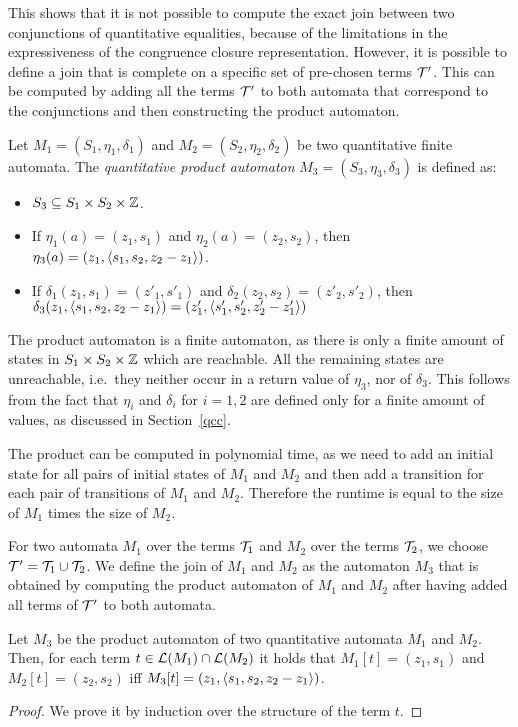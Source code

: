This shows that it is not possible to compute the exact join between two conjunctions of quantitative equalities, because of the limitations in the expressiveness of the congruence closure representation.
However, it is possible to define a join that is complete on  a specific set of pre-chosen terms $\mathcal{T}'$.
This can be computed by adding all the terms $\mathcal{T}'$ to both automata that correspond to the conjunctions and then constructing the product automaton.

\begin{definition}
    Let $M_1 = (S_1,\eta_1,\delta_1)$ and $M_2 = (S_2, \eta_2,\delta_2)$ be two quantitative finite automata. The \emph{quantitative product automaton} $M_3 = (S_3, \eta_3, \delta_3)$ is defined as:
    \begin{itemize}
        \item $S_3 \subseteq S_1 \times S_2 \times \mathbb{Z}$.
        \item If $\eta_1(a) = (z_1, s_1)$ and $\eta_2(a) = (z_2, s_2)$, then
              $\eta_3(a) = (z_1, \langle s_1, s_2, z_2-z_1\rangle)$.
        \item If $\delta_1(z_1, s_1) = (z'_1, s'_1)$ and $\delta_2(z_2, s_2) = (z'_2, s'_2)$, then $\delta_3(z_1, \langle s_1, s_2, z_2 - z_1\rangle) =  (z'_1, \langle s'_1, s'_2, z'_2 -z'_1\rangle)$
    \end{itemize}
\end{definition}

The product automaton is a finite automaton, as there is only a finite amount of states in $S_1 \times S_2 \times \mathbb{Z}$ which are reachable.
All the remaining states are unreachable, i.e.\ they neither occur in a return value of $\eta_3$, nor of $\delta_3$.
This follows from the fact that $\eta_i$ and $\delta_i$ for $i = 1,2$ are defined only for a finite amount of values, as discussed in Section~\ref{qcc}.

The product can be computed in polynomial time, as we need to add an initial state for all pairs of initial states of $M_1$ and $M_2$ and then add a transition for each pair of transitions of $M_1$ and $M_2$. Therefore the runtime is equal to the size of $M_1$ times the size of $M_2$.

For two automata $M_1$ over the terms $\mathcal{T}_1$ and $M_2$ over the terms $\mathcal{T}_2$, we choose $\mathcal{T}' = \mathcal{T}_1 \cup \mathcal{T}_2$.
We define the join of $M_1$ and $M_2$ as the automaton $M_3$ that is obtained by computing the product automaton of $M_1$ and $M_2$ after having added all terms of $\mathcal{T}'$ to both automata.

\begin{lemma}\label{lemma:join-automata}
    Let $M_3$ be the product automaton of two quantitative automata $M_1$ and $M_2$.
    Then, for each term $t \in \mathcal{L}(M_1) \cap \mathcal{L}(M_2)$ it holds that $M_1[t] = (z_1, s_1)$ and $M_2[t] = (z_2, s_2)$ iff $M_3[t] = (z_1, \langle s_1, s_2, z_2 - z_1\rangle)$.
\end{lemma}
\begin{proof}
    We prove it by induction over the structure of the term $t$.
\end{proof}

